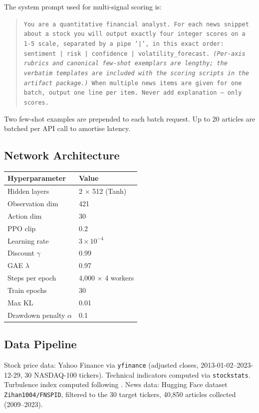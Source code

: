 \documentclass{article}
\begin{document}
The system prompt used for multi-signal scoring is:

\begin{quote}
\small
\texttt{You are a quantitative financial analyst. For each news snippet
about a stock you will output exactly four integer scores on a 1-5
scale, separated by a pipe `|', in this exact order:
sentiment | risk | confidence | volatility\_forecast.
\textit{(Per-axis rubrics and canonical few-shot exemplars are lengthy; the verbatim templates are included with the scoring scripts in the artifact package.)}
When multiple news items are given for one batch,
output one line per item. Never add explanation --- only scores.}
\end{quote}

Two few-shot examples are prepended to each batch request.
Up to 20 articles are batched per API call to amortise latency.

\subsection{Network Architecture}

\begin{center}
\begin{tabular}{ll}
\toprule
Hyperparameter & Value \\
\midrule
Hidden layers & 2 $\times$ 512 (Tanh) \\
Observation dim & 421 \\
Action dim & 30 \\
PPO clip & 0.2 \\
Learning rate & $3 \times 10^{-4}$ \\
Discount $\gamma$ & 0.99 \\
GAE $\lambda$ & 0.97 \\
Steps per epoch & 4,000 $\times$ 4 workers \\
Train epochs & 30 \\
Max KL & 0.01 \\
Drawdown penalty $\alpha$ & 0.1 \\
\bottomrule
\end{tabular}
\end{center}

\subsection{Data Pipeline}

Stock price data: Yahoo Finance via \texttt{yfinance} (adjusted closes,
2013-01-02–2023-12-29, 30 NASDAQ-100 tickers).
Technical indicators computed via \texttt{stockstats}.
Turbulence index computed following \citet{kritzman2010regime}.
News data: Hugging Face dataset \texttt{Zihan1004/FNSPID}, filtered
to the 30 target tickers, 40,850 articles collected (2009–2023).
\end{document}
